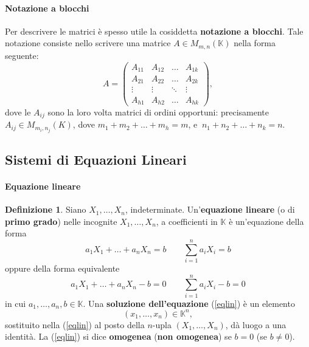 \documentclass{article}
\theoremstyle{plain}
\theoremstyle{definition}
\newtheorem{defn}{Definizione}[section]
\theoremstyle{remark}
\begin{document}
\vspace{10pt}

\paragraph{Notazione a blocchi}
Per descrivere le matrici è spesso utile la cosiddetta \textbf{notazione a blocchi}. 
Tale notazione consiste nello scrivere una matrice \( A \in M_{m,n}(\mathbb{K}) \) nella forma seguente:
\[
A = \begin{pmatrix}
A_{11} & A_{12} & \ldots & A_{1k} \\
A_{21} & A_{22} & \ldots & A_{2k} \\
\vdots & \vdots & \ddots & \vdots \\
A_{h1} & A_{h2} & \ldots & A_{hk}
\end{pmatrix},
\]
dove le \( A_{ij} \) sono la loro volta matrici di ordini opportuni: precisamente \( A_{ij} \in M_{m_i,n_j}(K) \), dove \( m_1 + m_2 + \ldots + m_h = m \), e  \(\  n_1 + n_2 + \ldots + n_k = n \).\\

\vspace{50pt}
\subsection{Sistemi di Equazioni Lineari}
\vspace{20pt}


\paragraph{Equazione lineare}
\begin{bxthm}
\begin{defn}
    Siano \( X_1, \ldots, X_n \), indeterminate. 
Un'\textbf{equazione lineare} (o di \textbf{primo grado}) nelle incognite \( X_1, \ldots, X_n \), a coefficienti in \( \mathbb{K} \) è un'equazione della forma
\begin{equation}
    a_1X_1 + \ldots + a_nX_n = b \quad\quad\sum_{i=1}^{n}a_iX_i=b\label{eqlin}
\end{equation}
oppure della forma equivalente
\[
    a_1X_1 + \ldots + a_nX_n - b = 0\quad\quad\sum_{i=1}^{n}a_iX_i-b=0
\]
in cui \( a_1, \ldots, a_n, b \in \mathbb{K} \). 
Una \textbf{soluzione dell'equazione} (\ref{eqlin}) è un elemento \[(x_1, \ldots, x_n) \in \mathbb{K}^n,\]  sostituito nella (\ref{eqlin}) al posto della \( n \)-upla \( (X_1, \ldots, X_n) \), dà luogo a una identità.
La (\ref{eqlin}) si dice \textbf{omogenea} (\textbf{non omogenea}) se \( b = 0 \) (se \( b \neq 0 \)).
\end{defn}
\end{bxthm}
\end{document}
